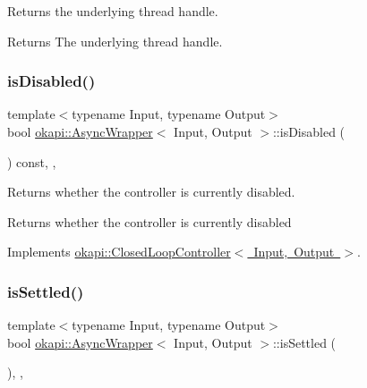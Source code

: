 Returns the underlying thread handle.

\begin{DoxyReturn}{Returns}
The underlying thread handle. 
\end{DoxyReturn}
\mbox{\label{classokapi_1_1AsyncWrapper_a83d411851373f0483b5ae392560a180a}} 
\subsubsection{\texorpdfstring{isDisabled()}{isDisabled()}}
{\footnotesize\ttfamily template$<$typename Input, typename Output$>$ \\
bool \mbox{\hyperlink{classokapi_1_1AsyncWrapper}{okapi\+::\+Async\+Wrapper}}$<$ Input, Output $>$\+::is\+Disabled (\begin{DoxyParamCaption}{ }\end{DoxyParamCaption}) const\hspace{0.3cm}{\ttfamily [inline]}, {\ttfamily [override]}, {\ttfamily [virtual]}}

Returns whether the controller is currently disabled.

\begin{DoxyReturn}{Returns}
whether the controller is currently disabled 
\end{DoxyReturn}


Implements \mbox{\hyperlink{classokapi_1_1ClosedLoopController_a40bd4ec2b8c75503fbf6f494fd7cbe69}{okapi\+::\+Closed\+Loop\+Controller$<$ Input, Output $>$}}.

\mbox{\label{classokapi_1_1AsyncWrapper_a93343937a8bbe762aeb6460197a22dfe}} 
\subsubsection{\texorpdfstring{isSettled()}{isSettled()}}
{\footnotesize\ttfamily template$<$typename Input, typename Output$>$ \\
bool \mbox{\hyperlink{classokapi_1_1AsyncWrapper}{okapi\+::\+Async\+Wrapper}}$<$ Input, Output $>$\+::is\+Settled (\begin{DoxyParamCaption}{ }\end{DoxyParamCaption})\hspace{0.3cm}{\ttfamily [inline]}, {\ttfamily [override]}, {\ttfamily [virtual]}}

